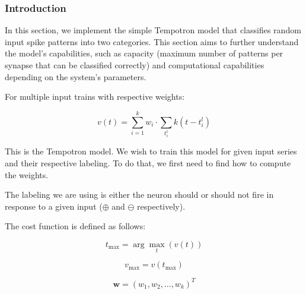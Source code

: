 \subsubsection{Introduction}

In this section, we implement the simple Tempotron model that classifies random input spike patterns into two categories. This section aims to further understand the model's capabilities, such as capacity (maximum number of patterns per synapse that can be classified correctly) and computational capabilities depending on the system's parameters.

For multiple input trains with respective weights:

\begin{equation}
    v(t) = \sum_{i=1}^k w_i \cdot \sum_{t_i^l} k(t-t_i^l)
\end{equation}

This is the Tempotron model. We wish to train this model for given input series and their respective labeling. To do that, we first need to find how to compute the weights.

The labeling we are using is either the neuron should or should not fire in response to a given input ($\oplus$ and $\ominus$ respectively).

The cost function is defined as follows:

\begin{equation}
    t_{\text{max}} = \arg\max_t (v(t))
\end{equation}

\begin{equation}
    v_{\text{max}} = v(t_{\text{max}})
\end{equation}

\begin{equation}
    \mathbf{w} = (w_1, w_2, \dots, w_k)^T
\end{equation}

